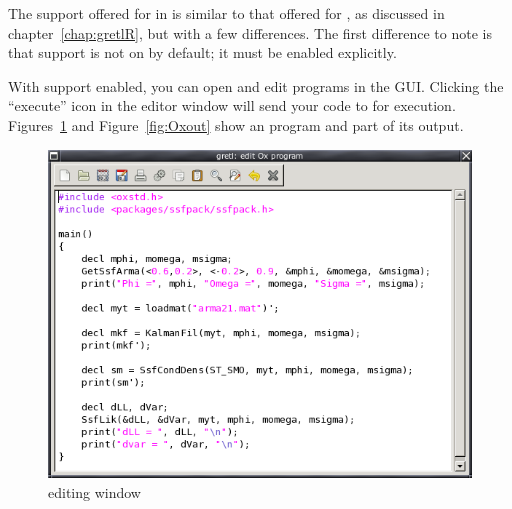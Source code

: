 The support offered for  in  is similar to that
offered for , as discussed in chapter~\ref{chap:gretlR}, but
with a few differences.  The first difference to note is that 
 support is not on by default; it must be enabled explicitly.

  
With support enabled, you can open and edit  programs in the
 GUI.  Clicking the ``execute'' icon in the editor window
will send your code to  for execution.
Figures~\ref{fig:Oxedit} and Figure~\ref{fig:Oxout} show an 
program and part of its output.

\begin{figure}[htbp]
  \centering
  \includegraphics[scale=0.7]{figures/Oxedit}
  \caption{ editing window}
  \label{fig:Oxedit}
\end{figure}

